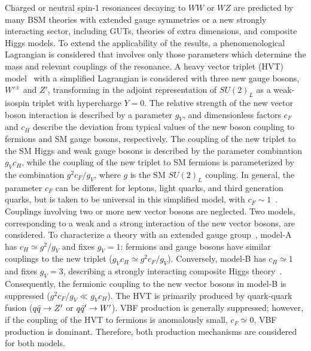 Charged or neutral spin-1 resonances decaying to $WW$ or $WZ$ are predicted by many BSM theories with extended gauge symmetries or a new strongly interacting sector, including GUTs, theories of extra dimensions, and composite Higgs models. To extend the applicability of the results, a phenomenological Lagrangian is considered that involves only those parameters which determine the mass and relevant couplings of the resonance. A heavy vector triplet (HVT) model~\cite{hvt_theory_1, hvt_theory_2} with a simplified Lagrangian is considered with three new gauge bosons, $W'^{\pm}$ and $Z'$, transforming in the adjoint representation of $SU(2)_L$ as a weak-isospin triplet with hypercharge $Y=0$. 
The relative strength of the new vector boson interaction is described by a parameter $g_V$, and dimensionless factors $c_F$ and $c_H$ describe the deviation from typical values of the new boson coupling to fermions and SM gauge bosons, respectively. The coupling of the new triplet to the SM Higgs and weak gauge bosons is described by the parameter combination $g_Vc_H$, while the coupling of the new triplet to SM fermions is parameterized by the combination $g^2c_F/g_V$, where $g$ is the SM $SU(2)_L$ coupling. 
In general, the parameter $c_F$ can be different for leptons, light quarks, and third generation quarks, but is taken to be universal in this simplified model, with $c_F\sim 1$~\cite{hvt_theory_1}. Couplings involving two or more new vector bosons are neglected.
Two models, corresponding to a weak and a strong interaction of the new vector bosons, are considered. To characterize a theory with an extended gauge group~\cite{hvt_model_a, hvt_model_a2}, model-A has $c_H\simeq g^2/g_V$ and fixes $g_V=1$: fermions and gauge bosons have similar couplings to the new triplet ($g_Vc_H\simeq g^2c_F/g_V$). Conversely, model-B has $c_H\simeq 1$ and fixes $g_V=3$, describing a strongly interacting composite Higgs theory~\cite{hvt_model_b_1,hvt_model_b_2, hvt_model_b_3}. Consequently, the fermionic coupling to the new vector bosons in model-B is suppressed ($g^2c_F/g_V \ll g_Vc_H$). The HVT is primarily produced by quark-quark fusion ($q\bar{q}\rightarrow Z'$ or $q\bar{q}'\rightarrow W'$). VBF production is generally suppressed;
however, if the coupling of the HVT to fermions is anomalously small, $c_F\simeq 0$, VBF production is dominant. Therefore, both production mechanisms are considered for both models. 

